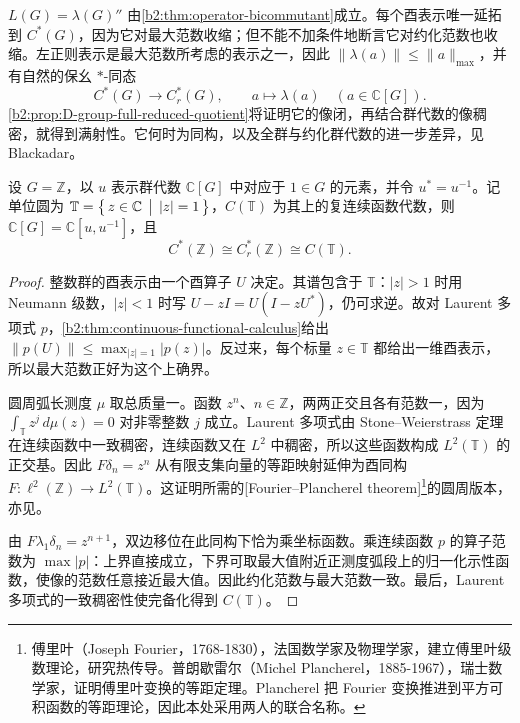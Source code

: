 \(L(G)=\lambda(G)''\) 由\cref{b2:thm:operator-bicommutant}成立。每个酉表示唯一延拓到 \(C^*(G)\)，因为它对最大范数收缩；但不能不加条件地断言它对约化范数也收缩。左正则表示是最大范数所考虑的表示之一，因此 \(\|\lambda(a)\|\le\|a\|_{\max}\)，并有自然的保幺 \(*\)-同态
\[
	C^*(G)\longrightarrow C_r^*(G),\qquad a\longmapsto\lambda(a) \quad(a\in\mathbb C[G]).
\]
\cref{b2:prop:D-group-full-reduced-quotient}将证明它的像闭，再结合群代数的像稠密，就得到满射性。它何时为同构，以及全群与约化群代数的进一步差异，见 Blackadar\cite[\nopp II.10.2.3--II.10.2.7]{Blackadar2017OperatorAlgebrasCorrected}。

\begin{proposition}\label{b2:prop:integer-group-cstar}
	设 \(G=\mathbb Z\)，以 \(u\) 表示群代数 \(\mathbb C[G]\) 中对应于 \(1\in G\) 的元素，并令 \(u^*=u^{-1}\)。记单位圆为 \(\mathbb T=\bigl\{\,z\in\mathbb C\,\bigm|\,|z|=1\,\bigr\}\)，\(C(\mathbb T)\) 为其上的复连续函数代数，则 \(\mathbb C[G]=\mathbb C[u,u^{-1}]\)，且
	\[
		C^*(\mathbb Z)\cong C_r^*(\mathbb Z)\cong C(\mathbb T).
	\]
\end{proposition}
\begin{proof}
	整数群的酉表示由一个酉算子 \(U\) 决定。其谱包含于 \(\mathbb T\)：\(|z|>1\) 时用 Neumann 级数，\(|z|<1\) 时写 \(U-zI=U(I-zU^*)\)，仍可求逆。故对 Laurent 多项式 \(p\)，\cref{b2:thm:continuous-functional-calculus}给出 \(\bigl\lVert p(U)\bigr\rVert\le\max_{|z|=1}\bigl|p(z)\bigr|\)。反过来，每个标量 \(z\in\mathbb T\) 都给出一维酉表示，所以最大范数正好为这个上确界。

	圆周弧长测度 \(\mu\) 取总质量一。函数 \(z^n\)、\(n\in\mathbb Z\)，两两正交且各有范数一，因为 \(\int_{\mathbb T}z^j\,d\mu(z)=0\) 对非零整数 \(j\) 成立。Laurent 多项式由 Stone--Weierstrass 定理在连续函数中一致稠密，连续函数又在 \(L^2\) 中稠密，所以这些函数构成 \(L^2(\mathbb T)\) 的正交基。因此 \(F\delta_n=z^n\) 从有限支集向量的等距映射延伸为酉同构 \(F:\ell^2(\mathbb Z)\to L^2(\mathbb T)\)。这证明所需的[Fourier--Plancherel theorem]\footnote{傅里叶（Joseph Fourier，1768-1830），法国数学家及物理学家，建立傅里叶级数理论，研究热传导。普朗歇雷尔（Michel Plancherel，1885-1967），瑞士数学家，证明傅里叶变换的等距定理。Plancherel 把 Fourier 变换推进到平方可积函数的等距理论，因此本处采用两人的联合名称。}的圆周版本，亦见\cite[Theorem II.10.1.15(iii)]{Blackadar2017OperatorAlgebrasCorrected}。

	由 \(F\lambda_1\delta_n=z^{n+1}\)，双边移位在此同构下恰为乘坐标函数。乘连续函数 \(p\) 的算子范数为 \(\max|p|\)：上界直接成立，下界可取最大值附近正测度弧段上的归一化示性函数，使像的范数任意接近最大值。因此约化范数与最大范数一致。最后，Laurent 多项式的一致稠密性使完备化得到 \(C(\mathbb T)\)。
\end{proof}

